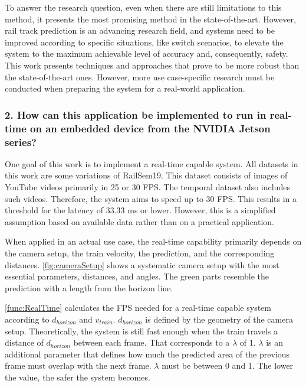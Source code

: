 To answer the research question, even when there are still limitations to this method, it presents the most promising method in the state-of-the-art.
However, rail track prediction is an advancing research field, and systems need to be improved according to specific situations, like switch scenarios, to elevate the system to the maximum achievable level of accuracy and, consequently, safety.
This work presents techniques and approaches that prove to be more robust than the state-of-the-art ones.
However, more use case-specific research must be conducted when preparing the system for a real-world application.

\subsubsection{2. How can this application be implemented to run in real-time on an embedded device from the NVIDIA Jetson series?}

One goal of this work is to implement a real-time capable system.
All datasets in this work are some variations of RailSem19.
This dataset consists of images of YouTube videos primarily in 25 or 30 \ac{FPS}.
The temporal dataset also includes such videos.
Therefore, the system aims to speed up to 30 \ac{FPS}.
This results in a threshold for the latency of 33.33 ms or lower.
However, this is a simplified assumption based on available data rather than on a practical application.

When applied in an actual use case, the real-time capability primarily depends on the camera setup, the train velocity, the prediction, and the corresponding distances.
\autoref{fig:cameraSetup} shows a systematic camera setup with the most essential parameters, distances, and angles.
The green parts resemble the prediction with a length from the horizon line.

\autoref{func:RealTime} calculates the \ac{FPS} needed for a real-time capable system according to $d_{horizon}$ and $v_{train}$.
$d_{horizon}$ is defined by the geometry of the camera setup.
Theoretically, the system is still fast enough when the train travels a distance of $d_{horizon}$ between each frame.
That corresponds to a $\lambda$ of 1.
$\lambda$ is an additional parameter that defines how much the predicted area of the previous frame must overlap with the next frame.
$\lambda$ must be between 0 and 1.
The lower the value, the safer the system becomes.

